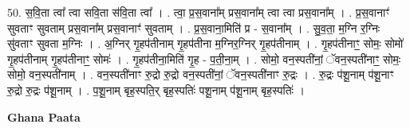 \documentclass[17pt]{extarticle}
\begin{document}
50. स॒वि॒ता त्वा᳚ त्वा सवि॒ता स॑वि॒ता त्वा᳚ । . त्वा॒ प्र॒स॒वाना᳚म् प्रस॒वाना᳚म् त्वा त्वा प्रस॒वाना᳚म् । . प्र॒स॒वानाꣳ॑ सुवताꣳ सुवताम् प्रस॒वाना᳚म् प्रस॒वानाꣳ॑ सुवताम् । . प्र॒स॒वाना॒मिति॑ प्र - स॒वाना᳚म् । . सु॒व॒ता॒ म॒ग्नि र॒ग्निः सु॑वताꣳ सुवता म॒ग्निः । . अ॒ग्निर् गृ॒हप॑तीनाम् गृ॒हप॑तीना म॒ग्निर॒ग्निर् गृ॒हप॑तीनाम् । . गृ॒हप॑तीनाꣳ॒॒ सोमः॒ सोमो॑ गृ॒हप॑तीनाम् गृ॒हप॑तीनाꣳ॒॒ सोमः॑ । . गृ॒हप॑तीना॒मिति॑ गृ॒ह - प॒ती॒ना॒म् । . सोमो॒ वन॒स्पती॑नां॒ ॅवन॒स्पती॑नाꣳ॒॒ सोमः॒ सोमो॒ वन॒स्पती॑नाम् । . वन॒स्पती॑नाꣳ रु॒द्रो रु॒द्रो वन॒स्पती॑नां॒ ॅवन॒स्पती॑नाꣳ रु॒द्रः । . रु॒द्रः प॑शू॒नाम् प॑शू॒नाꣳ रु॒द्रो रु॒द्रः प॑शू॒नाम् । . प॒शू॒नाम् बृह॒स्पति॒र् बृह॒स्पतिः॑ पशू॒नाम् प॑शू॒नाम् बृह॒स्पतिः॑ । \newline

\textbf{Ghana Paata } \newline
\end{document}
